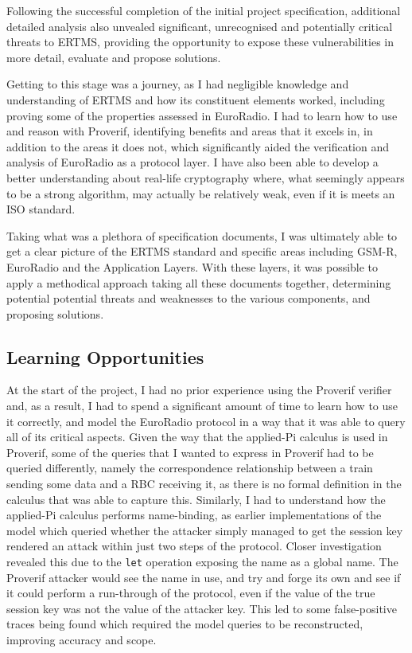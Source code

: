 \documentclass[twoside,11pt,a4paper]{article}
\begin{document}
Following the successful completion of the initial project specification, additional detailed analysis also unvealed significant, unrecognised and potentially critical threats to ERTMS, providing the opportunity to expose these vulnerabilities in more detail, evaluate and propose solutions.

Getting to this stage was a journey, as I had negligible knowledge and understanding of ERTMS and how its constituent elements worked, including proving some of the properties assessed in EuroRadio. I had to learn how to use and reason with Proverif, identifying benefits and areas that it excels in, in addition to the areas it does not, which significantly aided the verification and analysis of EuroRadio as a protocol layer. I have also been able to develop a better understanding about real-life cryptography where, what seemingly appears to be a strong algorithm, may actually be relatively weak, even if it is meets an ISO standard.

Taking what was a plethora of specification documents, I was ultimately able to get a clear picture of the ERTMS standard and specific areas including GSM-R, EuroRadio and the Application Layers. With these layers, it was possible to apply a methodical approach taking all these documents together, determining potential potential threats and weaknesses to the various components, and proposing solutions.

\subsection{Learning Opportunities}
At the start of the project, I had no prior experience using the Proverif verifier and, as a result, I had to spend a significant amount of time to learn how to use it correctly, and model the EuroRadio protocol in a way that it was able to query all of its critical aspects. Given the way that the applied-Pi calculus is used in Proverif, some of the queries that I wanted to express in Proverif had to be queried differently, namely the correspondence relationship between a train sending some data and a RBC receiving it, as there is no formal definition in the calculus that was able to capture this. Similarly, I had to understand how the applied-Pi calculus performs name-binding, as earlier implementations of the model which queried whether the attacker simply managed to get the session key rendered an attack within just two steps of the protocol. Closer investigation revealed this due to the \texttt{let} operation exposing the name as a global name. The Proverif attacker would see the name in use, and try and forge its own and see if it could perform a run-through of the protocol, even if the value of the true session key was not the value of the attacker key. This led to some false-positive traces being found which required the model queries to be reconstructed, improving accuracy and scope.
\end{document}
